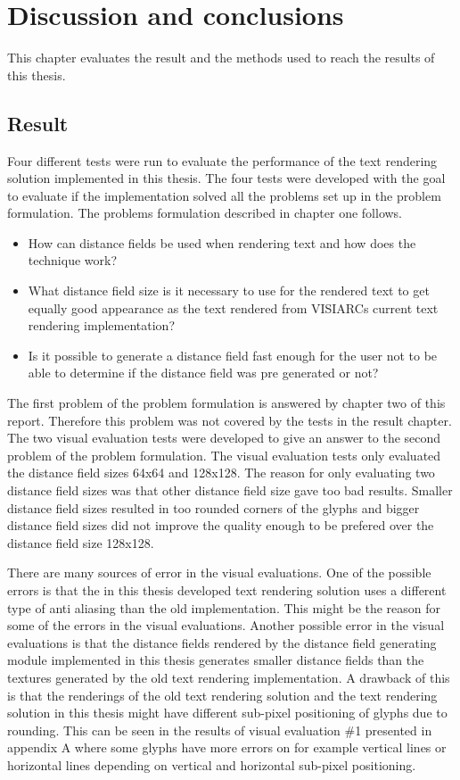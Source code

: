 \chapter{Discussion and conclusions}
This chapter evaluates the result and the methods used to reach the results of this thesis.
\section{Result}
Four different tests were run to evaluate the performance of the text rendering solution implemented in this thesis. The four tests were developed with the goal to evaluate if the implementation solved all the problems set up in the problem formulation. The problems formulation described in chapter one follows.
\begin{itemize}
  \item How can distance fields be used when rendering text and how does the technique work?
  \item What distance field size is it necessary to use for the rendered text to get equally good appearance as the text rendered from VISIARCs current text rendering implementation?
  \item Is it possible to generate a distance field fast enough for the user not to be able to determine if the distance field was pre generated or not?
\end{itemize} 
The first problem of the problem formulation is answered by chapter two of this report. Therefore this problem was not covered by the tests in the result chapter. The two visual evaluation tests were developed to give an answer to the second problem of the problem formulation. The visual evaluation tests only evaluated the distance field sizes 64x64 and 128x128. The reason for only evaluating two distance field sizes was that other distance field size gave too bad results. Smaller distance field sizes resulted in too rounded corners of the glyphs and bigger distance field sizes did not improve the quality enough to be prefered over the distance field size 128x128.

There are many sources of error in the visual evaluations. One of the possible errors is that the in this thesis developed text rendering solution uses a different type of anti aliasing than the old implementation. This might be the reason for some of the errors in the visual evaluations. Another possible error in the visual evaluations is that the distance fields rendered by the distance field generating module implemented in this thesis generates smaller distance fields than the textures generated by the old text rendering implementation. A drawback of this is that the renderings of the old text rendering solution and the text rendering solution in this thesis might have different sub-pixel positioning of glyphs due to rounding. This can be seen in the results of visual evaluation \#1 presented in appendix A where some glyphs have more errors on for example vertical lines or horizontal lines depending on vertical and horizontal sub-pixel positioning.

